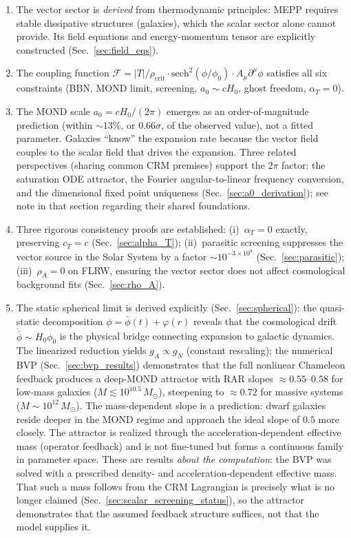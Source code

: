 \documentclass[aps,prd,twocolumn,superscriptaddress,nofootinbib]{revtex4-2}
\begin{document}
\begin{enumerate}
\item The vector sector is \textit{derived} from thermodynamic principles: MEPP requires stable dissipative structures (galaxies), which the scalar sector alone cannot provide. Its field equations and energy-momentum tensor are explicitly constructed (Sec.~\ref{sec:field_eqs}).

\item The coupling function $\mathcal{F} = |T|/\rho_{\mathrm{crit}} \cdot \mathrm{sech}^2(\phi/\phi_0) \cdot A_\mu\partial^\mu\phi$ satisfies all six constraints (BBN, MOND limit, screening, $a_0 \sim cH_0$, ghost freedom, $\alpha_T = 0$).

\item The MOND scale $a_0 = cH_0/(2\pi)$ emerges as an order-of-magnitude prediction (within $\sim 13\%$, or $0.66\sigma$, of the observed value), not a fitted parameter. Galaxies ``know'' the expansion rate because the vector field couples to the scalar field that drives the expansion. Three related perspectives (sharing common CRM premises) support the $2\pi$ factor: the saturation ODE attractor, the Fourier angular-to-linear frequency conversion, and the dimensional fixed point uniqueness (Sec.~\ref{sec:a0_derivation}); see note in that section regarding their shared foundations.

\item Three rigorous consistency proofs are established: (i)~$\alpha_T = 0$ exactly, preserving $c_T = c$ (Sec.~\ref{sec:alpha_T}); (ii)~parasitic screening suppresses the vector source in the Solar System by a factor $\sim 10^{-3 \times 10^9}$ (Sec.~\ref{sec:parasitic}); (iii)~$\rho_A = 0$ on FLRW, ensuring the vector sector does not affect cosmological background fits (Sec.~\ref{sec:rho_A}).

\item The static spherical limit is derived explicitly (Sec.~\ref{sec:spherical}): the quasi-static decomposition $\phi = \bar{\phi}(t) + \varphi(r)$ reveals that the cosmological drift $\dot{\bar{\phi}} \sim H_0\phi_0$ is the physical bridge connecting expansion to galactic dynamics. The linearized reduction yields $g_A \propto g_N$ (constant rescaling); the numerical BVP (Sec.~\ref{sec:bvp_results}) demonstrates that the full nonlinear Chameleon feedback produces a deep-MOND attractor with RAR slopes $\approx 0.55$--$0.58$ for low-mass galaxies ($M \lesssim 10^{10.5}\,M_\odot$), steepening to $\approx 0.72$ for massive systems ($M \sim 10^{12}\,M_\odot$). The mass-dependent slope is a prediction: dwarf galaxies reside deeper in the MOND regime and approach the ideal slope of $0.5$ more closely. The attractor is realized through the acceleration-dependent effective mass (operator feedback) and is not fine-tuned but forms a continuous family in parameter space. These are results \textit{about the computation}: the BVP was solved with a prescribed density- and acceleration-dependent effective mass. That such a mass follows from the CRM Lagrangian is precisely what is no longer claimed (Sec.~\ref{sec:scalar_screening_status}), so the attractor demonstrates that the assumed feedback structure suffices, not that the model supplies it.


\end{enumerate}
\end{document}
